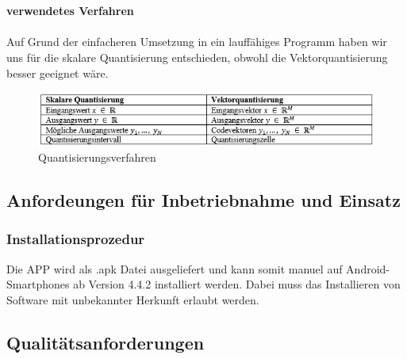 \\
\\
\textbf{verwendetes Verfahren}
\\
\\
Auf Grund der einfacheren Umsetzung in ein lauffähiges Programm haben wir uns für die skalare Quantisierung entschieden, obwohl die Vektorquantisierung besser geeignet wäre.

\begin{figure}[h]
	\centering
		\includegraphics[width=1.0\textwidth]{img/Stephan.png}
	\caption[Quantisierungsverfahren]{Quantisierungsverfahren}
	\label{fig:stephan_quant}
\end{figure}

\subsection{\textbf{Anfordeungen für Inbetriebnahme und Einsatz}}




\subsubsection{Installationsprozedur}

Die \acs{APP} wird als .apk Datei ausgeliefert und kann somit manuel auf Android-Smartphones ab Version 4.4.2 installiert werden.
Dabei muss das Installieren von Software mit unbekannter Herkunft erlaubt werden.




\subsection{\textbf{Qualitätsanforderungen}}

